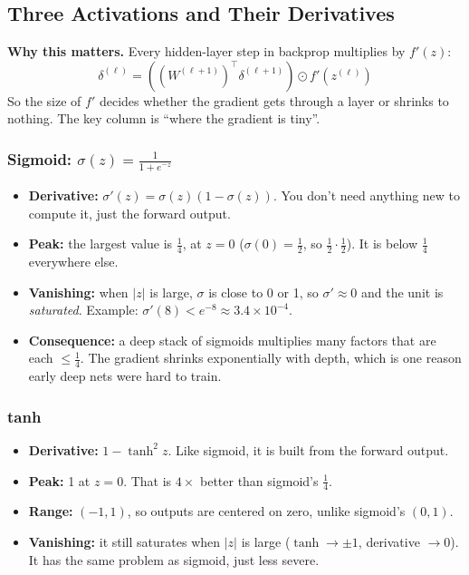 \subsection*{Three Activations and Their Derivatives}

\textbf{Why this matters.} Every hidden-layer step in backprop multiplies by $f'(z)$:
\[
\delta^{(\ell)} = \left( (W^{(\ell+1)})^\top \delta^{(\ell+1)} \right) \odot f'(z^{(\ell)})
\]
So the size of $f'$ decides whether the gradient gets through a layer or shrinks to nothing. The key column is ``where the gradient is tiny''.

\subsubsection*{Sigmoid: $\sigma(z) = \frac{1}{1+e^{-z}}$}
\begin{itemize}
  \item \textbf{Derivative:} $\sigma'(z) = \sigma(z)(1-\sigma(z))$. You don't need anything new to compute it, just the forward output.
  \item \textbf{Peak:} the largest value is $\frac{1}{4}$, at $z=0$ ($\sigma(0)=\frac{1}{2}$, so $\frac{1}{2}\cdot\frac{1}{2}$). It is below $\frac{1}{4}$ everywhere else.
  \item \textbf{Vanishing:} when $|z|$ is large, $\sigma$ is close to 0 or 1, so $\sigma' \approx 0$ and the unit is \emph{saturated}. Example: $\sigma'(8) < e^{-8} \approx 3.4 \times 10^{-4}$.
  \item \textbf{Consequence:} a deep stack of sigmoids multiplies many factors that are each $\le \frac{1}{4}$. The gradient shrinks exponentially with depth, which is one reason early deep nets were hard to train.
\end{itemize}

\subsubsection*{tanh}
\begin{itemize}
  \item \textbf{Derivative:} $1 - \tanh^2 z$. Like sigmoid, it is built from the forward output.
  \item \textbf{Peak:} 1 at $z=0$. That is $4\times$ better than sigmoid's $\frac{1}{4}$.
  \item \textbf{Range:} $(-1, 1)$, so outputs are centered on zero, unlike sigmoid's $(0,1)$.
  \item \textbf{Vanishing:} it still saturates when $|z|$ is large ($\tanh \to \pm 1$, derivative $\to 0$). It has the same problem as sigmoid, just less severe.
\end{itemize}

